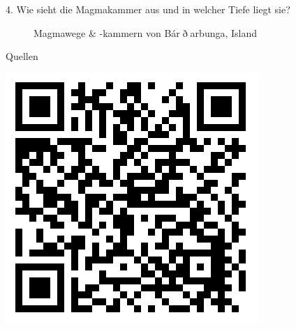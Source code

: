 \documentclass[xcolor=dvipsnames]{beamer}
\begin{document}
\begin{frame}[t]{}
\begin{block}{\LARGE 4. Wie sieht die Magmakammer aus und in welcher Tiefe liegt sie?}
\begin{minipage}{0.42\textwidth}
\begin{figure}
       \caption{\Large Magmawege \& -kammern von Bár$\eth$arbunga, Island}
  \end{figure}
  \vskip -10mm
  \begin{block}{\LARGE Quellen}
	\begin{minipage}[h]{0.78\textwidth}
	\vskip 10mm
	\large

	\end{minipage}
	\hfill
	\begin{minipage}[h]{0.2\textwidth}
          \includegraphics[scale=0.6]{images/11.jpg}
	\end{minipage}
  \end{block}
  \end{minipage}
      
  \end{block}
\end{frame}
\end{document}
